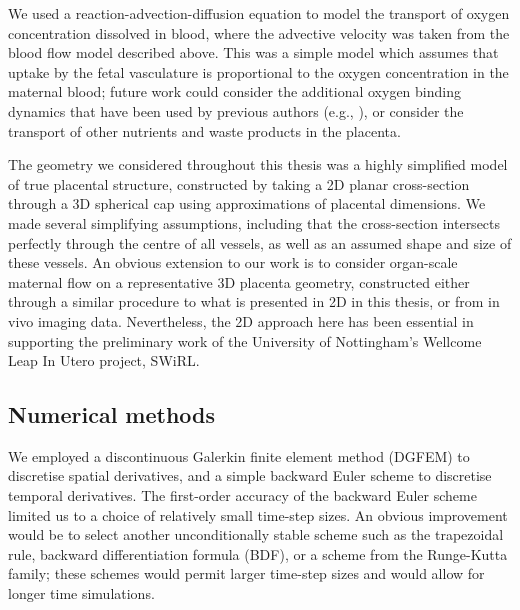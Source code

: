             We used a reaction-advection-diffusion equation to model the transport of oxygen concentration dissolved in blood, where the advective velocity was taken from the blood flow model described above. This was a simple model which assumes that uptake by the fetal vasculature is proportional to the oxygen concentration in the maternal blood; future work could consider the additional oxygen binding dynamics that have been used by previous authors (e.g., \cite{serovOptimalVilliDensity2015, pearceImageBasedModelingBlood2016}), or consider the transport of other nutrients and waste products in the placenta.

            The geometry we considered throughout this thesis was a highly simplified model of true placental structure, constructed by taking a 2D planar cross-section through a 3D spherical cap using approximations of placental dimensions. We made several simplifying assumptions, including that the cross-section intersects perfectly through the centre of all vessels, as well as an assumed shape and size of these vessels. An obvious extension to our work is to consider organ-scale maternal flow on a representative 3D placenta geometry, constructed either through a similar procedure to what is presented in 2D in this thesis, or from in vivo imaging data. Nevertheless, the 2D approach here has been essential in supporting the preliminary work of the University of Nottingham's Wellcome Leap In Utero project, SWiRL.
            
        \subsection{Numerical methods}
            We employed a discontinuous Galerkin finite element method (DGFEM) to discretise spatial derivatives, and a simple backward Euler scheme to discretise temporal derivatives. The first-order accuracy of the backward Euler scheme limited us to a choice of relatively small time-step sizes. An obvious improvement would be to select another unconditionally stable scheme such as the trapezoidal rule, backward differentiation formula (BDF), or a scheme from the Runge-Kutta family; these schemes would permit larger time-step sizes and would allow for longer time simulations.

